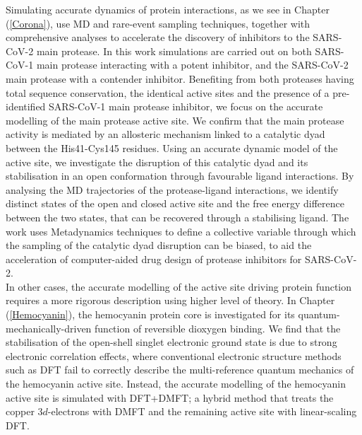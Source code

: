 Simulating accurate dynamics of protein interactions, as we see in Chapter (\ref{Corona}), use MD and rare-event sampling techniques, together with comprehensive analyses to accelerate the discovery of inhibitors to the SARS-CoV-2 main protease. In this work simulations are carried out on both SARS-CoV-1 main protease interacting with a potent inhibitor, and the SARS-CoV-2 main protease with a contender inhibitor. Benefiting from both proteases having total sequence conservation, the identical active sites and the presence of a pre-identified SARS-CoV-1 main protease inhibitor, we focus on the accurate modelling of the main protease active site. We confirm that the main protease activity is mediated by an allosteric mechanism linked to a catalytic dyad between the His41-Cys145 residues. Using an accurate dynamic model of the active site, we investigate the disruption of this catalytic dyad and its stabilisation in an open conformation through favourable ligand interactions. By analysing the MD trajectories of the protease-ligand interactions, we identify distinct states of the open and closed active site and the free energy difference between the two states, that can be recovered through a stabilising ligand. The work uses Metadynamics techniques to define a collective variable through which the sampling of the catalytic dyad disruption can be biased, to aid the acceleration of computer-aided drug design of protease inhibitors for SARS-CoV-2.\\ 

In other cases, the accurate modelling of the active site driving protein function requires a more rigorous description using higher level of theory. In Chapter (\ref{Hemocyanin}), the hemocyanin protein core is investigated for its quantum-mechanically-driven function of reversible dioxygen binding. We find that the stabilisation of the open-shell singlet electronic ground state is due to strong electronic correlation effects, where conventional electronic structure methods such as DFT fail to correctly describe the multi-reference quantum mechanics of the hemocyanin active site. Instead, the accurate modelling of the hemocyanin active site is simulated with DFT+DMFT; a hybrid method that treats the copper 3$d$-electrons with DMFT and the remaining active site with linear-scaling DFT. 